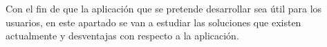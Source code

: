 Con el fin de que la aplicación que se pretende desarrollar sea útil para los usuarios, en este apartado se van a estudiar las soluciones que existen actualmente y desventajas con respecto a la aplicación.